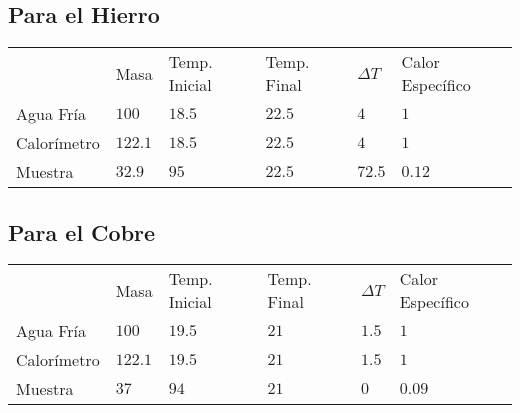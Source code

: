 \subsection{Para el Hierro}
\begin{table}[H]%
	\centering
	\begin{tabular}{L{2cm}C{1.5cm}C{2.2cm}C{2cm}C{1.3cm}C{2.5cm}}
		 & Masa    & Temp. Inicial & Temp. Final & $\Delta T$ & Calor Específico \\
		Agua Fría          & $100$   & $18.5$        & $22.5$      & $4$        & $1$              \\
		Calorímetro        & $122.1$ & $18.5$        & $22.5$      & $4$        & $1$              \\
		Muestra            & $32.9$  & $95$          & $22.5$      & $72.5$     & $0.12$           \\
	\end{tabular}
\end{table}
\subsection{Para el Cobre}
\begin{table}[H]%
	\centering
	\begin{tabular}{L{2cm}C{1.5cm}C{2.2cm}C{2cm}C{1.3cm}C{2.5cm}}
		 & Masa    & Temp. Inicial & Temp. Final & $\Delta T$ & Calor Específico \\
		Agua Fría          & $100$   & $19.5$        & $21$        & $1.5$      & $1$              \\
		Calorímetro        & $122.1$ & $19.5$        & $21$        & $1.5$      & $1$              \\
		Muestra            & $37$    & $94$          & $21$        & $0$        & $0.09$           \\
	\end{tabular}
\end{table}
